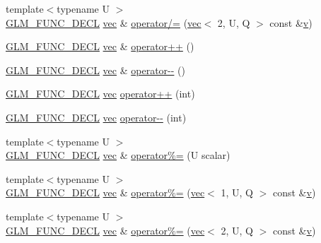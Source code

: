 \begin{DoxyCompactItemize}
\item 
{\footnotesize template$<$typename U $>$ }\\\hyperlink{setup_8hpp_ab2d052de21a70539923e9bcbf6e83a51}{G\+L\+M\+\_\+\+F\+U\+N\+C\+\_\+\+D\+E\+CL} \hyperlink{structglm_1_1vec}{vec} \& \hyperlink{structglm_1_1vec_3_012_00_01_t_00_01_q_01_4_a5c779bb132a97e91d6d8180a9c3fe31d}{operator/=} (\hyperlink{structglm_1_1vec}{vec}$<$ 2, U, Q $>$ const \&\hyperlink{_s_d_l__opengl_8h_a10a82eabcb59d2fcd74acee063775f90}{v})
\item 
\hyperlink{setup_8hpp_ab2d052de21a70539923e9bcbf6e83a51}{G\+L\+M\+\_\+\+F\+U\+N\+C\+\_\+\+D\+E\+CL} \hyperlink{structglm_1_1vec}{vec} \& \hyperlink{structglm_1_1vec_3_012_00_01_t_00_01_q_01_4_a3b86debb295909f1369aebf4b9a834ab}{operator++} ()
\item 
\hyperlink{setup_8hpp_ab2d052de21a70539923e9bcbf6e83a51}{G\+L\+M\+\_\+\+F\+U\+N\+C\+\_\+\+D\+E\+CL} \hyperlink{structglm_1_1vec}{vec} \& \hyperlink{structglm_1_1vec_3_012_00_01_t_00_01_q_01_4_a213bf05d1d3abd8ed5da4908cd3dfdd7}{operator-\/-\/} ()
\item 
\hyperlink{setup_8hpp_ab2d052de21a70539923e9bcbf6e83a51}{G\+L\+M\+\_\+\+F\+U\+N\+C\+\_\+\+D\+E\+CL} \hyperlink{structglm_1_1vec}{vec} \hyperlink{structglm_1_1vec_3_012_00_01_t_00_01_q_01_4_ab6bd7fc778f3585723da44341d9d5c37}{operator++} (int)
\item 
\hyperlink{setup_8hpp_ab2d052de21a70539923e9bcbf6e83a51}{G\+L\+M\+\_\+\+F\+U\+N\+C\+\_\+\+D\+E\+CL} \hyperlink{structglm_1_1vec}{vec} \hyperlink{structglm_1_1vec_3_012_00_01_t_00_01_q_01_4_a6017c4f43c83945ca60837ec727f4c43}{operator-\/-\/} (int)
\item 
{\footnotesize template$<$typename U $>$ }\\\hyperlink{setup_8hpp_ab2d052de21a70539923e9bcbf6e83a51}{G\+L\+M\+\_\+\+F\+U\+N\+C\+\_\+\+D\+E\+CL} \hyperlink{structglm_1_1vec}{vec} \& \hyperlink{structglm_1_1vec_3_012_00_01_t_00_01_q_01_4_a56d5575c010ab98d5fd63852ecaf0bcc}{operator\%=} (U scalar)
\item 
{\footnotesize template$<$typename U $>$ }\\\hyperlink{setup_8hpp_ab2d052de21a70539923e9bcbf6e83a51}{G\+L\+M\+\_\+\+F\+U\+N\+C\+\_\+\+D\+E\+CL} \hyperlink{structglm_1_1vec}{vec} \& \hyperlink{structglm_1_1vec_3_012_00_01_t_00_01_q_01_4_a4e0dc1a7c70bbb39328fb5f31a5b9bf0}{operator\%=} (\hyperlink{structglm_1_1vec}{vec}$<$ 1, U, Q $>$ const \&\hyperlink{_s_d_l__opengl_8h_a10a82eabcb59d2fcd74acee063775f90}{v})
\item 
{\footnotesize template$<$typename U $>$ }\\\hyperlink{setup_8hpp_ab2d052de21a70539923e9bcbf6e83a51}{G\+L\+M\+\_\+\+F\+U\+N\+C\+\_\+\+D\+E\+CL} \hyperlink{structglm_1_1vec}{vec} \& \hyperlink{structglm_1_1vec_3_012_00_01_t_00_01_q_01_4_afd83c730132c6344a400715a0f82c846}{operator\%=} (\hyperlink{structglm_1_1vec}{vec}$<$ 2, U, Q $>$ const \&\hyperlink{_s_d_l__opengl_8h_a10a82eabcb59d2fcd74acee063775f90}{v})

\end{DoxyCompactItemize}
